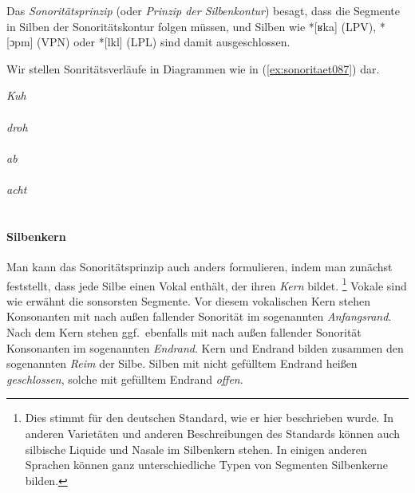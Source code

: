 Das \textit{Sonoritätsprinzip} (oder \textit{Prinzip der Silbenkontur}) besagt, dass die Segmente in Silben der Sonoritätskontur folgen müssen, und Silben wie *[ʁka] (LPV), *[ɔpm] (VPN) oder *[lkl] (LPL) sind damit ausgeschlossen.

Wir stellen Sonritätsverläufe in Diagrammen wie in (\ref{ex:sonoritaet087}) dar.

\begin{exe}
  \ex\label{ex:sonoritaet087}
  \begin{xlist}
    \ex\label{ex:sonoritaet088} \textit{Kuh}\\[0.5\baselineskip]\leavevmode
      \\[0.5\baselineskip]
    \ex\label{ex:sonoritaet091} \textit{droh}\\[0.5\baselineskip]\leavevmode
      \\[0.5\baselineskip]
    \ex\label{ex:sonoritaet095} \textit{ab}\\[0.5\baselineskip]\leavevmode
      \\[0.5\baselineskip]
    \ex\label{ex:sonoritaet097} \textit{acht}\\[0.5\baselineskip]\leavevmode
      \\[0.5\baselineskip]
  \end{xlist}
\end{exe}

\paragraph*{Silbenkern}

Man kann das Sonoritätsprinzip auch anders formulieren, indem man zunächst feststellt, dass jede Silbe einen Vokal enthält, der ihren \textit{Kern} bildet.%
\footnote{Dies stimmt für den deutschen Standard, wie er hier beschrieben wurde.
In anderen Varietäten und anderen Beschreibungen des Standards können auch silbische Liquide und Nasale im Silbenkern stehen.
In einigen anderen Sprachen können ganz unterschiedliche Typen von Segmenten Silbenkerne bilden.}
Vokale sind wie erwähnt die sonsorsten Segmente.
Vor diesem vokalischen Kern stehen Konsonanten mit nach außen fallender Sonorität im sogenannten \textit{Anfangsrand}.
Nach dem Kern stehen ggf.\ ebenfalls mit nach außen fallender Sonorität Konsonanten im sogenannten \textit{Endrand}.
Kern und Endrand bilden zusammen den sogenannten \textit{Reim} der Silbe.
Silben mit nicht gefülltem Endrand heißen \textit{geschlossen}, solche mit gefülltem Endrand \textit{offen}.


